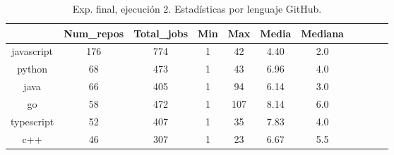 \begin{table}[h]
  \centering
  \caption{Exp. final, ejecución 2. Estadísticas por lenguaje GitHub.}
  \label{tab:tabla_f_2_3}

\begin{footnotesize}
\renewcommand{\arraystretch}{1.5} %
\begin{tabular}{ccccccccccc}
  \hline
  {} &  Num\_repos &  Total\_jobs &  Min &  Max &  Media &  Mediana \\
  \hline
  javascript    &        176 &         774 &    1 &   42 &    4.40 &      2.0 \\
  python        &         68 &         473 &    1 &   43 &    6.96 &      4.0 \\
  java          &         66 &         405 &    1 &   94 &    6.14 &      3.0 \\
  go            &         58 &         472 &    1 &  107 &    8.14 &      6.0 \\
  typescript    &         52 &         407 &    1 &   35 &    7.83 &      4.0 \\
  c++           &         46 &         307 &    1 &   23 &    6.67 &      5.5 \\

\end{tabular}
\end{footnotesize}
\end{table}
